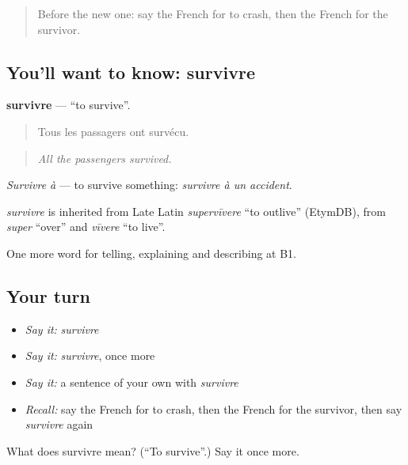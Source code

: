 \begin{quote}
Before the new one: say the French for to crash, then the French for the survivor.
\end{quote}

\subsection*{You'll want to know: survivre}
\textbf{survivre} — \textquotedblleft{}to survive\textquotedblright{}.

\begin{quote}
Tous les passagers ont survécu.
\end{quote}

\begin{quote}
\emph{All the passengers survived.}
\end{quote}

\emph{Survivre à} — to survive something: \emph{survivre à un accident}.

\begin{cousinweb}
\emph{survivre} is inherited from Late Latin \emph{supervīvere} \textquotedblleft{}to outlive\textquotedblright{} (EtymDB), from \emph{super} \textquotedblleft{}over\textquotedblright{} and \emph{vīvere} \textquotedblleft{}to live\textquotedblright{}.
\end{cousinweb}

\begin{grammarlens}[title={What you've built}]
One more word for telling, explaining and describing at B1.
\end{grammarlens}

\subsection*{Your turn}
\begin{itemize}
\raggedright
  \item \emph{Say it:} \emph{survivre}
  \item \emph{Say it:} \emph{survivre}, once more
  \item \emph{Say it:} a sentence of your own with \emph{survivre}
  \item \emph{Recall:} say the French for to crash, then the French for the survivor, then say \emph{survivre} again
\end{itemize}

\begin{tcolorbox}[breakable,colback=teal!4,colframe=teal!35!black,title={Before you move on}]
What does survivre mean? (\textquotedblleft{}To survive\textquotedblright{}.) Say it once more.
\end{tcolorbox}
